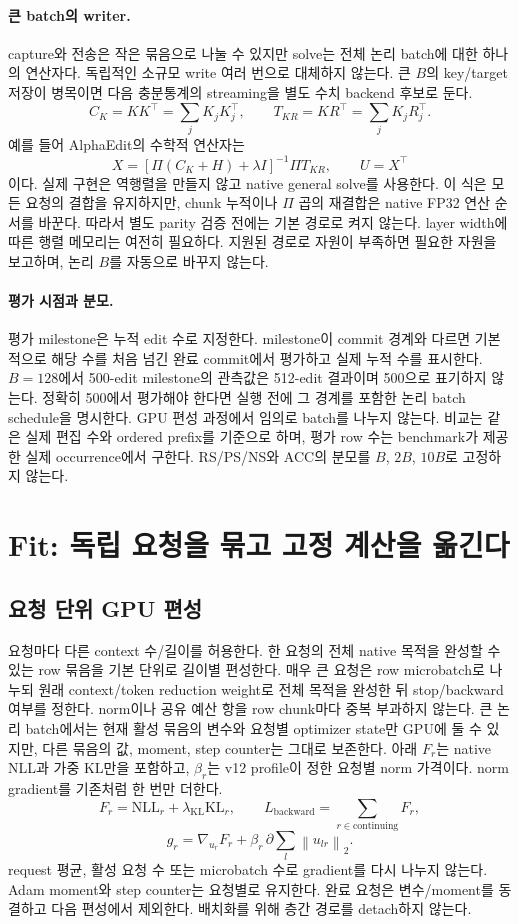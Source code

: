 \documentclass[11pt]{article}
\newcommand{\norm}[1]{\left\lVert #1\right\rVert}
\begin{document}
\paragraph{큰 batch의 writer.}
capture와 전송은 작은 묶음으로 나눌 수 있지만 solve는 전체 논리 batch에 대한
하나의 연산자다. 독립적인 소규모 write 여러 번으로 대체하지 않는다.
큰 $B$의 key/target 저장이 병목이면 다음 충분통계의 streaming을 별도 수치
backend 후보로 둔다.
\[
 C_K=KK^\top=\sum_j K_jK_j^\top,\qquad
 T_{KR}=KR^\top=\sum_j K_jR_j^\top.
\]
예를 들어 AlphaEdit의 수학적 연산자는
\[
 X=[\Pi(C_K+H)+\lambda I]^{-1}\Pi T_{KR},\qquad U=X^\top
\]
이다. 실제 구현은 역행렬을 만들지 않고 native general solve를 사용한다.
이 식은 모든 요청의 결합을 유지하지만, chunk 누적이나 $\Pi$ 곱의 재결합은
native FP32 연산 순서를 바꾼다. 따라서 별도 parity 검증 전에는 기본 경로로
켜지 않는다. layer width에 따른 행렬 메모리는 여전히 필요하다. 지원된 경로로
자원이 부족하면 필요한 자원을 보고하며, 논리 $B$를 자동으로 바꾸지 않는다.

\paragraph{평가 시점과 분모.}
평가 milestone은 누적 edit 수로 지정한다. milestone이 commit 경계와 다르면
기본적으로 해당 수를 처음 넘긴 완료 commit에서 평가하고 실제 누적 수를 표시한다.
$B=128$에서 500-edit milestone의 관측값은 512-edit 결과이며 500으로 표기하지 않는다.
정확히 500에서 평가해야 한다면 실행 전에 그 경계를 포함한 논리 batch schedule을
명시한다. GPU 편성 과정에서 임의로 batch를 나누지 않는다. 비교는 같은 실제
편집 수와 ordered prefix를 기준으로 하며, 평가 row 수는 benchmark가 제공한
실제 occurrence에서 구한다. RS/PS/NS와 ACC의 분모를 $B$, $2B$, $10B$로
고정하지 않는다.

\section{Fit: 독립 요청을 묶고 고정 계산을 옮긴다}
\subsection{요청 단위 GPU 편성}
요청마다 다른 context 수/길이를 허용한다. 한 요청의 전체 native 목적을 완성할 수
있는 row 묶음을 기본 단위로 길이별 편성한다. 매우 큰 요청은 row microbatch로
나누되 원래 context/token reduction weight로 전체 목적을 완성한 뒤 stop/backward
여부를 정한다. norm이나 공유 예산 항을 row chunk마다 중복 부과하지 않는다.
큰 논리 batch에서는 현재 활성 묶음의 변수와 요청별 optimizer state만 GPU에
둘 수 있지만, 다른 묶음의 값, moment, step counter는 그대로 보존한다.
아래 $F_r$는 native NLL과 가중 KL만을 포함하고, $\beta_r$는 v12 profile이
정한 요청별 norm 가격이다. norm gradient를 기존처럼 한 번만 더한다.
\[
 F_r=\mathrm{NLL}_r+\lambda_{\mathrm{KL}}\mathrm{KL}_r,\qquad
 L_{\mathrm{backward}}=\sum_{r\in\mathrm{continuing}} F_r,
\]
\[
 g_r=\nabla_{u_r}F_r+\beta_r\,\partial\sum_l\norm{u_{lr}}_2.
\]
request 평균, 활성 요청 수 또는 microbatch 수로 gradient를 다시 나누지 않는다.
Adam moment와 step counter는 요청별로 유지한다. 완료 요청은 변수/moment를 동결하고
다음 편성에서 제외한다. 배치화를 위해 층간 경로를 detach하지 않는다.
\end{document}
